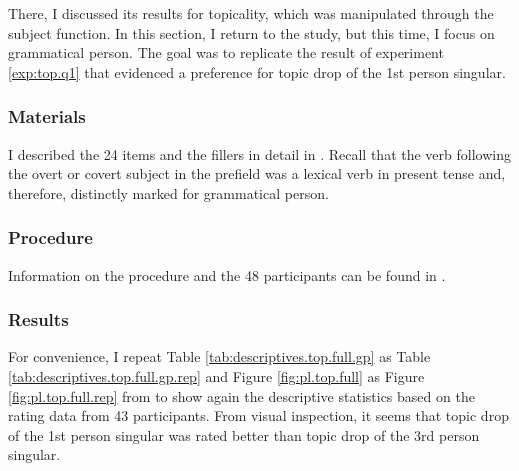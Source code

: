 There, I discussed its results for topicality, which was manipulated through the subject function.
In this section, I return to the study, but this time, I focus on grammatical person.
The goal was to replicate the result of experiment \ref*{exp:top.q1} that evidenced a preference for topic drop of the 1st person singular.

\subsubsection{Materials}
I described the 24 items and the fillers in detail in .
Recall that the verb following the overt or covert subject in the prefield was a lexical verb  in present tense and, therefore, distinctly marked for grammatical person.

\subsubsection{Procedure}
Information on the procedure and the 48 participants can be found in .

\subsubsection{Results}\label{sec:exp.top.fv.person.results.}
For convenience, I repeat Table \ref{tab:descriptives.top.full.gp} as Table \ref{tab:descriptives.top.full.gp.rep} and Figure \ref{fig:pl.top.full} as Figure \ref{fig:pl.top.full.rep} from  to show again the descriptive statistics based on the rating data from 43 participants.
From visual inspection, it seems that topic drop of the 1st person singular was rated better than topic drop of the 3rd person singular.

